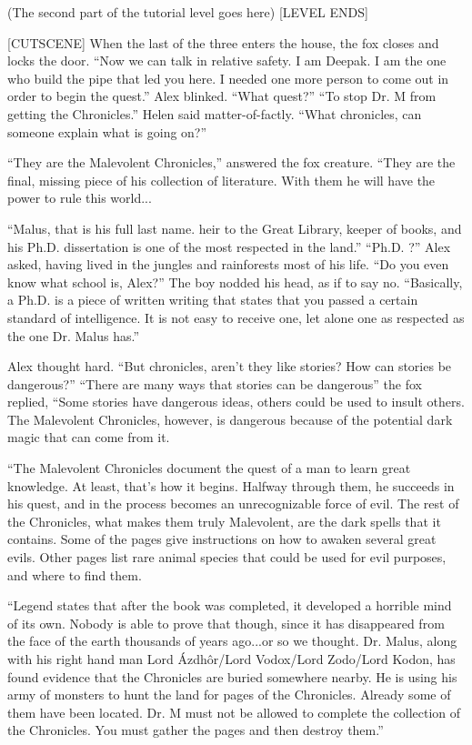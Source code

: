 \documentclass{gd-document}
\begin{document}
(The second part of the tutorial level goes here) [LEVEL ENDS]

[CUTSCENE] When the last of the three enters the house, the fox closes
and locks the door. “Now we can talk in relative safety. I am
Deepak. I am the one who build the pipe that led you here. I needed
one more person to come out in order to begin the quest.” Alex
blinked. “What quest?” “To stop Dr. M from getting the Chronicles.”
Helen said matter-of-factly. “What chronicles, can someone explain
what is going on?”

“They are the Malevolent Chronicles,” answered the fox creature. “They
are the final, missing piece of his collection of literature. With
them he will have the power to rule this world...

“Malus, that is his full last name. heir to the Great Library, keeper
of books, and his Ph.D. dissertation is one of the most respected in
the land.” “Ph.D. ?” Alex asked, having lived in the jungles and
rainforests most of his life. “Do you even know what school is, Alex?”
The boy nodded his head, as if to say no. “Basically, a Ph.D. is a
piece of written writing that states that you passed a certain
standard of intelligence. It is not easy to receive one, let alone one
as respected as the one Dr. Malus has.”

Alex thought hard. “But chronicles, aren't they like stories? How can
stories be dangerous?” “There are many ways that stories can be
dangerous” the fox replied, “Some stories have dangerous ideas, others
could be used to insult others. The Malevolent Chronicles, however, is
dangerous because of the potential dark magic that can come from it.

“The Malevolent Chronicles document the quest of a man to learn great
knowledge. At least, that's how it begins. Halfway through them, he
succeeds in his quest, and in the process becomes an unrecognizable
force of evil. The rest of the Chronicles, what makes them truly
Malevolent, are the dark spells that it contains. Some of the pages
give instructions on how to awaken several great evils. Other pages
list rare animal species that could be used for evil purposes, and
where to find them.

“Legend states that after the book was completed, it developed a
horrible mind of its own. Nobody is able to prove that though, since
it has disappeared from the face of the earth thousands of years
ago...or so we thought. Dr. Malus, along with his right hand man Lord
Ázdhôr/Lord Vodox/Lord Zodo/Lord Kodon, has found evidence that the
Chronicles are buried somewhere nearby. He is using his army of
monsters to hunt the land for pages of the Chronicles. Already some of
them have been located. Dr. M must not be allowed to complete the
collection of the Chronicles. You must gather the pages and then
destroy them.”
\end{document}

